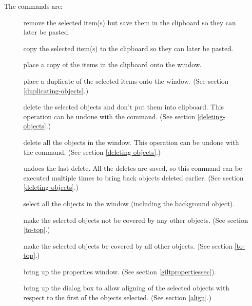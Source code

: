 The commands are:
\begin{description}
\item[]  \dash remove the selected item(s) but save them in the clipboard
so they can later be pasted.

\item[]  \dash copy the selected item(s) to the clipboard so they can
later be pasted.

\item[]  \dash place a copy of the items in the clipboard onto the window.

\item[]  \dash place a duplicate of the selected items onto the window.
(See section \ref{duplicating-objects}.)

\item[]  \dash delete the selected objects and don't put them into
clipboard.  This operation can be undone with the 
command.  (See section \ref{deleting-objects}.)

\item[]  \dash delete all the objects in the window.  This
operation can be undone with the  command.
(See section \ref{deleting-objects}.)

\item[]  \dash undoes the last delete.  All the deletes are
saved, so this command can be executed multiple times to bring back
objects deleted earlier.  (See section \ref{deleting-objects}.)

\item[]  \dash select all the objects in the window (including the
background object).

\item[]  \dash make the selected objects not be covered by any other objects.
(See section \ref{to-top}.)

\item[]  \dash make the selected objects be covered by all other objects.
(See section \ref{to-top}.)

\item[]  \dash bring up the properties window.  (See section
\ref{giltpropertiessec}).

\item[]  \dash bring up the dialog box to allow aligning of the selected
objects with respect to the first of the objects selected.
(See section \ref{align}.)
\end{description}


